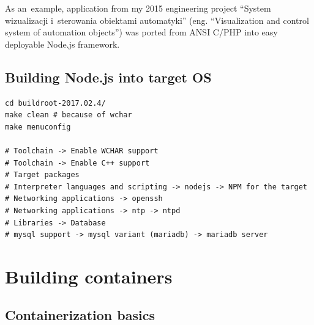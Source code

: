\documentclass[printmode]{mgr}
\begin{document}
As an~example, application from my 2015 engineering project ``System wizualizacji i~sterowania obiektami automatyki'' (eng. ``Visualization and control system of automation objects'') was ported from ANSI C/PHP into easy deployable Node.js framework.

\subsection*{Building Node.js into target OS}

\begin{lstlisting}
cd buildroot-2017.02.4/
make clean # because of wchar
make menuconfig

# Toolchain -> Enable WCHAR support
# Toolchain -> Enable C++ support
# Target packages
# Interpreter languages and scripting -> nodejs -> NPM for the target
# Networking applications -> openssh
# Networking applications -> ntp -> ntpd
# Libraries -> Database
# mysql support -> mysql variant (mariadb) -> mariadb server
\end{lstlisting}






















\section{Building containers}


\subsection*{Containerization basics}
\end{document}
